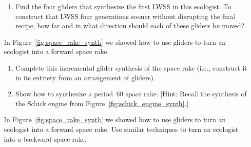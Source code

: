 \begin{multicols}{2}
\begin{problem}
\begin{enumerate}[label=\bf\color{ocre}(\alph*)]
		
		\item Find the four gliders that synthesize the first LWSS in this ecologist. To construct that LWSS four generations sooner without disrupting the final recipe, how far and in what direction should each of these gliders be moved?
		
		
	\end{enumerate}
\end{problem}


\mfilbreak


\begin{problemstar}\label{exer:make_space_rake_synth}
	In Figure~\ref{fig:space_rake_synth} we showed how to use gliders to turn an ecologist into a forward space rake.
	\begin{enumerate}[label=\bf\color{ocre}(\alph*)]
		\item Complete this incremental glider synthesis of the space rake (i.e., construct it in its entirety from an arrangement of gliders).
		
		\item Show how to synthesize a period~$60$ space rake. [Hint: Recall the synthesis of the Schick engine from Figure~\ref{fig:schick_engine_synth}.]
	\end{enumerate}
\end{problemstar}


\mfilbreak


\begin{problemstar}\label{exer:space_rake_synth}
	In Figure~\ref{fig:space_rake_synth} we showed how to use gliders to turn an ecologist into a forward space rake. Use similar techniques to turn an ecologist into a backward space rake.
\end{problemstar}



\end{multicols}
